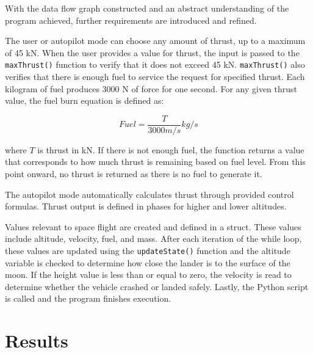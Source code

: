 \documentclass{article}
\begin{document}
\newpage
With the data flow graph constructed and an abstract understanding of the program achieved, further requirements are introduced and refined. 

The user or autopilot mode can choose any amount of thrust, up to a maximum of 45 kN. When the user provides a value for thrust, the input is passed to the \texttt{maxThrust()} function to verify that it does not exceed 45 kN. \texttt{maxThrust()} also verifies that there is enough fuel to service the request for specified thrust. Each kilogram of fuel produces 3000 N of force for one second. For any given thrust value, the fuel burn equation is defined as:

\[Fuel = \frac{T}{3000 m/s}  kg/s\]

where $T$ is thrust in kN. If there is not enough fuel, the function returns a value that corresponds to how much thrust is remaining based on fuel level. From this point onward, no thrust is returned as there is no fuel to generate it.

The autopilot mode automatically calculates thrust through provided control formulas. Thrust output is defined in phases for higher and lower altitudes.

Values relevant to space flight are created and defined in a struct. These values include altitude, velocity, fuel, and mass. After each iteration of the while loop, these values are updated using the \texttt{updateState()} function and the altitude variable is checked to determine how close the lander is to the surface of the moon. If the height value is less than or equal to zero, the velocity is read to determine whether the vehicle crashed or landed safely. Lastly, the Python script is called and the program finishes execution.

\section{Results}




\end{document}
